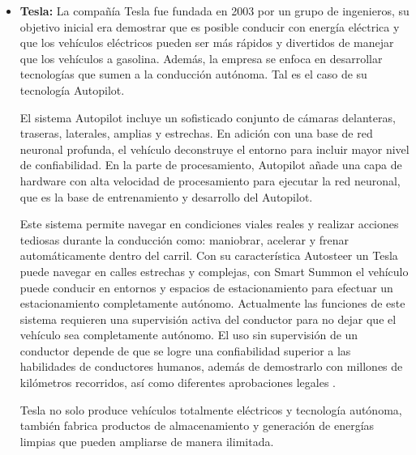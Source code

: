 \begin{itemize}
    \item \textbf{Tesla:} La compañía Tesla fue fundada en 2003 por un grupo de ingenieros, su objetivo inicial era demostrar que es posible conducir con energía eléctrica y que los vehículos eléctricos pueden ser más rápidos y divertidos de manejar que los vehículos a gasolina. Además, la empresa se enfoca en desarrollar tecnologías que sumen a la conducción autónoma. Tal es el caso de su tecnología Autopilot.
    
    El sistema Autopilot incluye un sofisticado conjunto de cámaras delanteras, traseras, laterales, amplias y estrechas. En adición con una base de red neuronal profunda, el vehículo deconstruye el entorno para incluir mayor nivel de confiabilidad. En la parte de procesamiento, Autopilot añade una capa de hardware con alta velocidad de procesamiento para ejecutar la red neuronal, que es la base de entrenamiento y desarrollo del Autopilot.
    
    Este sistema permite navegar en condiciones viales reales y realizar acciones tediosas durante la conducción como: maniobrar, acelerar y frenar automáticamente dentro del carril. Con su característica Autosteer un Tesla puede navegar en calles estrechas y complejas, con Smart Summon el vehículo puede conducir en entornos y espacios de estacionamiento para efectuar un estacionamiento completamente autónomo. Actualmente las funciones de este sistema requieren una supervisión activa del conductor para no dejar que el vehículo sea completamente autónomo. El uso sin supervisión de un conductor depende de que se logre una confiabilidad superior a las habilidades de conductores humanos, además de demostrarlo con millones de kilómetros recorridos, así como diferentes aprobaciones legales \cite{autopilot}.
    
    Tesla no solo produce vehículos totalmente eléctricos y tecnología autónoma, también fabrica productos de almacenamiento y generación de energías limpias que pueden ampliarse de manera ilimitada. 
    
    
    
    

\end{itemize}

